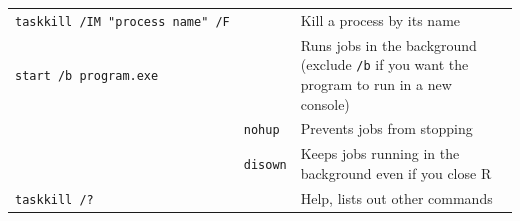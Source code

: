 \documentclass[]{book}
\begin{document}
\begin{longtable}[]{@{}lll@{}}
\begin{minipage}[t]{0.13\columnwidth}\raggedright\strut
\texttt{taskkill\ /IM\ "process\ name"\ /F}\strut
\end{minipage} & \begin{minipage}[t]{0.18\columnwidth}\raggedright\strut
\strut
\end{minipage} & \begin{minipage}[t]{0.18\columnwidth}\raggedright\strut
Kill a process by its name\strut
\end{minipage}\tabularnewline
\begin{minipage}[t]{0.13\columnwidth}\raggedright\strut
\texttt{start\ /b\ program.exe}\strut
\end{minipage} & \begin{minipage}[t]{0.18\columnwidth}\raggedright\strut
\strut
\end{minipage} & \begin{minipage}[t]{0.18\columnwidth}\raggedright\strut
Runs jobs in the background (exclude \texttt{/b} if you want the program
to run in a new console)\strut
\end{minipage}\tabularnewline
\begin{minipage}[t]{0.13\columnwidth}\raggedright\strut
\strut
\end{minipage} & \begin{minipage}[t]{0.18\columnwidth}\raggedright\strut
\texttt{nohup}\strut
\end{minipage} & \begin{minipage}[t]{0.18\columnwidth}\raggedright\strut
Prevents jobs from stopping\strut
\end{minipage}\tabularnewline
\begin{minipage}[t]{0.13\columnwidth}\raggedright\strut
\strut
\end{minipage} & \begin{minipage}[t]{0.18\columnwidth}\raggedright\strut
\texttt{disown}\strut
\end{minipage} & \begin{minipage}[t]{0.18\columnwidth}\raggedright\strut
Keeps jobs running in the background even if you close R\strut
\end{minipage}\tabularnewline
\begin{minipage}[t]{0.13\columnwidth}\raggedright\strut
\texttt{taskkill\ /?}\strut
\end{minipage} & \begin{minipage}[t]{0.18\columnwidth}\raggedright\strut
\strut
\end{minipage} & \begin{minipage}[t]{0.18\columnwidth}\raggedright\strut
Help, lists out other commands\strut
\end{minipage}\tabularnewline
\bottomrule
\end{longtable}
\end{document}
